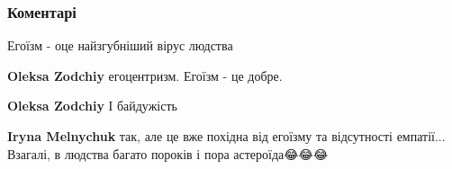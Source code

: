  
 
 
 
 
\subsubsection{Коментарі}

\begin{itemize}
 
Егоїзм - оце найзгубніший вірус людства

\begin{itemize}
 
\textbf{Oleksa Zodchiy} егоцентризм. Егоїзм - це добре.

 
\textbf{Oleksa Zodchiy}
І байдужість

 
\textbf{Iryna Melnychuk} так, але це вже похідна від егоїзму та відсутності емпатії... Взагалі, в людства багато пороків і пора астероїда😂😂😂
\end{itemize}

 

\end{itemize}
